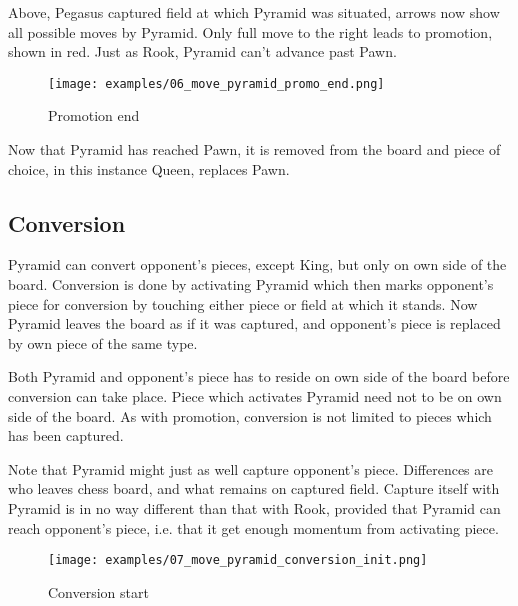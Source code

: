 Above, Pegasus captured field at which Pyramid was situated, arrows now show
all possible moves by Pyramid. Only full move to the right leads to promotion,
shown in red. Just as Rook, Pyramid can't advance past Pawn.

\clearpage

\noindent
\begin{figure}[!h]
\texttt{[image: examples/06\_move\_pyramid\_promo\_end.png]}
\caption{Promotion end}
\label{fig:ma_promo_end}
\end{figure}

Now that Pyramid has reached Pawn, it is removed from the board and piece of
choice, in this instance Queen, replaces Pawn.

\clearpage

\subsection*{Conversion}

Pyramid can convert opponent's pieces, except King, but only on own side of
the board. Conversion is done by activating Pyramid which then marks opponent's
piece for conversion by touching either piece or field at which it stands. Now
Pyramid leaves the board as if it was captured, and opponent's piece is replaced
by own piece of the same type.

Both Pyramid and opponent's piece has to reside on own side of the board
before conversion can take place. Piece which activates Pyramid need not
to be on own side of the board. As with promotion, conversion is not limited
to pieces which has been captured.

Note that Pyramid might just as well capture opponent's piece. Differences are
who leaves chess board, and what remains on captured field. Capture itself with
Pyramid is in no way different than that with Rook, provided that Pyramid can
reach opponent's piece, i.e. that it get enough momentum from activating piece.

\clearpage

\noindent
\begin{figure}[!h]
\texttt{[image: examples/07\_move\_pyramid\_conversion\_init.png]}
\caption{Conversion start}
\label{fig:ma_conversion_init}
\end{figure}

